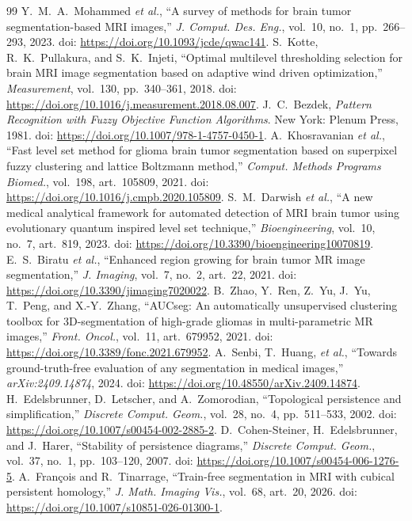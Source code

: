 \documentclass[11pt,a4paper]{article}
\begin{document}
\begin{thebibliography}{99}
 Y.~M.~A.~Mohammed \emph{et al.}, ``A survey of methods for brain tumor segmentation-based MRI images,'' \emph{J. Comput. Des. Eng.}, vol.~10, no.~1, pp.~266--293, 2023. doi: \url{https://doi.org/10.1093/jcde/qwac141}.
 S.~Kotte, R.~K.~Pullakura, and S.~K.~Injeti, ``Optimal multilevel thresholding selection for brain MRI image segmentation based on adaptive wind driven optimization,'' \emph{Measurement}, vol.~130, pp.~340--361, 2018. doi: \url{https://doi.org/10.1016/j.measurement.2018.08.007}.
 J.~C.~Bezdek, \emph{Pattern Recognition with Fuzzy Objective Function Algorithms}. New York: Plenum Press, 1981. doi: \url{https://doi.org/10.1007/978-1-4757-0450-1}.
 A.~Khosravanian \emph{et al.}, ``Fast level set method for glioma brain tumor segmentation based on superpixel fuzzy clustering and lattice Boltzmann method,'' \emph{Comput. Methods Programs Biomed.}, vol.~198, art.~105809, 2021. doi: \url{https://doi.org/10.1016/j.cmpb.2020.105809}.
 S.~M.~Darwish \emph{et al.}, ``A new medical analytical framework for automated detection of MRI brain tumor using evolutionary quantum inspired level set technique,'' \emph{Bioengineering}, vol.~10, no.~7, art.~819, 2023. doi: \url{https://doi.org/10.3390/bioengineering10070819}.
 E.~S.~Biratu \emph{et al.}, ``Enhanced region growing for brain tumor MR image segmentation,'' \emph{J. Imaging}, vol.~7, no.~2, art.~22, 2021. doi: \url{https://doi.org/10.3390/jimaging7020022}.
 B.~Zhao, Y.~Ren, Z.~Yu, J.~Yu, T.~Peng, and X.-Y.~Zhang, ``AUCseg: An automatically unsupervised clustering toolbox for 3D-segmentation of high-grade gliomas in multi-parametric MR images,'' \emph{Front. Oncol.}, vol.~11, art.~679952, 2021. doi: \url{https://doi.org/10.3389/fonc.2021.679952}.
 A.~Senbi, T.~Huang, \emph{et al.}, ``Towards ground-truth-free evaluation of any segmentation in medical images,'' \emph{arXiv:2409.14874}, 2024. doi: \url{https://doi.org/10.48550/arXiv.2409.14874}.
 H.~Edelsbrunner, D.~Letscher, and A.~Zomorodian, ``Topological persistence and simplification,'' \emph{Discrete Comput. Geom.}, vol.~28, no.~4, pp.~511--533, 2002. doi: \url{https://doi.org/10.1007/s00454-002-2885-2}.
 D.~Cohen-Steiner, H.~Edelsbrunner, and J.~Harer, ``Stability of persistence diagrams,'' \emph{Discrete Comput. Geom.}, vol.~37, no.~1, pp.~103--120, 2007. doi: \url{https://doi.org/10.1007/s00454-006-1276-5}.
 A.~Fran\c{c}ois and R.~Tinarrage, ``Train-free segmentation in MRI with cubical persistent homology,'' \emph{J. Math. Imaging Vis.}, vol.~68, art.~20, 2026. doi: \url{https://doi.org/10.1007/s10851-026-01300-1}.

\end{thebibliography}
\end{document}
